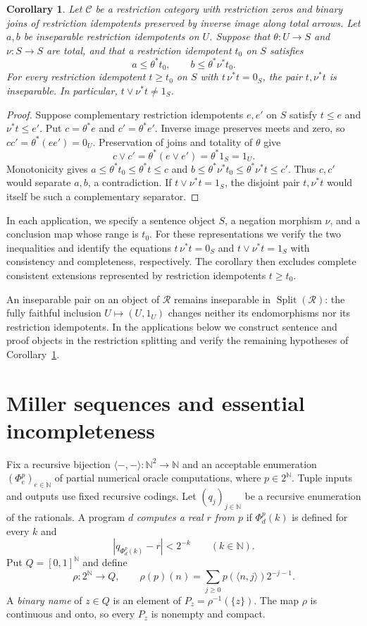 \documentclass[11pt]{article}
\newtheorem{corollary}[theorem]{Corollary}
\newcommand{\N}{\mathbb N}
\begin{document}
\begin{corollary}\label{cor:domain-incompleteness}
Let $\mathcal C$ be a restriction category with restriction zeros and
binary joins of restriction idempotents preserved by inverse image along total arrows.
Let $a,b$ be inseparable restriction idempotents on $U$. Suppose that
$\theta:U\to S$ and $\nu:S\to S$ are total, and that a restriction
idempotent $t_0$ on $S$ satisfies
\[
 a\le\theta^*t_0,\qquad b\le\theta^*\nu^*t_0.
\]
For every restriction idempotent $t\ge t_0$ on $S$ with $t\,\nu^*t=0_S$,
the pair $t,\nu^*t$ is inseparable. In particular,
$t\vee\nu^*t\ne1_S$.
\end{corollary}
\begin{proof}
Suppose complementary restriction idempotents $e,e'$ on $S$ satisfy
$t\le e$ and $\nu^*t\le e'$. Put
$c=\theta^*e$ and $c'=\theta^*e'$. Inverse image preserves
meets and zero, so $cc'=\theta^*(ee')=0_U$.
Preservation of joins and totality of $\theta$ give
\[
 c\vee c'=\theta^*(e\vee e')=\theta^*1_S=1_U.
\]
Monotonicity gives
$a\le\theta^*t_0\le\theta^*t\le c$ and
$b\le\theta^*\nu^*t_0\le\theta^*\nu^*t\le c'$.
Thus $c,c'$ would separate $a,b$, a contradiction.
If $t\vee\nu^*t=1_S$, the disjoint pair $t,\nu^*t$ would
itself be such a complementary separator.
\end{proof}

In each application, we specify a sentence object $S$, a negation
morphism $\nu$, and a conclusion map whose range is $t_0$.
For these representations we verify the two inequalities and identify
the equations $t\,\nu^*t=0_S$ and $t\vee\nu^*t=1_S$ with
consistency and completeness, respectively. The corollary then excludes
complete consistent extensions represented by restriction idempotents
$t\ge t_0$.

An inseparable pair on an object of $\mathscr R$ remains inseparable
in $\operatorname{Split}(\mathscr R)$: the fully faithful inclusion
$U\mapsto(U,1_U)$ changes neither its endomorphisms nor its restriction idempotents.
In the applications below we construct sentence and proof objects in
the restriction splitting and verify the remaining hypotheses of
Corollary~\ref{cor:domain-incompleteness}.

\section{Miller sequences and essential incompleteness}\label{sec:miller}

Fix a recursive bijection $\langle-,-\rangle:\N^2\to\N$ and an
acceptable enumeration $(\Phi_e^p)_{e\in\N}$ of partial numerical
oracle computations, where $p\in2^{\N}$. Tuple inputs and outputs use
fixed recursive codings. Let $(q_j)_{j\in\N}$ be a recursive enumeration
of the rationals. A program $d$ \emph{computes a real $r$ from $p$}
if $\Phi_d^p(k)$ is defined for every $k$ and
\[
 |q_{\Phi_d^p(k)}-r|<2^{-k}\qquad(k\in\N).
\]
Put $Q=[0,1]^{\N}$ and define
\[
 \rho:2^{\N}\longrightarrow Q,\qquad
 \rho(p)(n)=\sum_{j\geq0}p(\langle n,j\rangle)2^{-j-1}.
\]
A \emph{binary name} of $z\in Q$ is an element of
$P_z=\rho^{-1}(\{z\})$. The map $\rho$ is continuous and onto,
so every $P_z$ is nonempty and compact.
\end{document}
